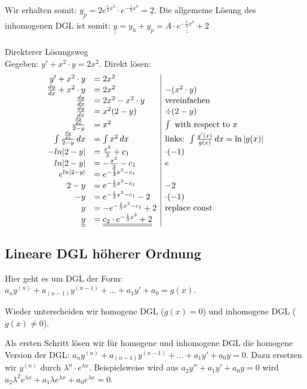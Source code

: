 Wir erhalten somit: $\underline{y_p} = 2 e^{\frac{1}{3}x^3} \cdot e^{-\frac{1}{3}x^3} = \underline{2}$.
Die allgemeine Lösung des inhomogenen DGL ist somit:
$\underline{\underline{y}} = y_h + y_p = \underline{\underline{A \cdot e^{-\frac{1}{3}x^3} + 2}}$
\\
\\
Direkterer Lösungsweg\\
Gegeben: $y' + x^2 \cdot y = 2x^2$.
Direkt lösen:
\begin{equation*}
\begin{array}{r l |l}
y' + x^2 \cdot y &= 2x^2\\
\frac{dy}{dx} + x^2 \cdot y &= 2x^2 \quad & -(x^2 \cdot y)\\
\frac{dy}{dx} &= 2x^2 -x^2 \cdot y \quad & \text{vereinfachen}\\
\frac{dy}{dx} &= x^2 ( 2 - y) \quad & \div (2 - y) \\
\frac{\frac{dy}{dx}}{2 - y} &= x^2  & \int \text{ with respect to } x \\
\int \frac{\frac{dy}{dx}}{2 - y}  \, dx &= \int x^2 \, dx & \text{links: } \int \frac{g'(x)}{g(x)} \, dx = \ln|g(x)|\\ 
- ln |2 - y| &= \frac{x^3}{3} + c_1 & \cdot (-1) \\
ln |2 - y| &= - \frac{x^3}{3} - c_1 & e \\
e^{ln |2 - y|} &= e^{-\frac{1}{3}x^3 - c_1 } \\
2 - y &= e^{-\frac{1}{3}x^3 - c_1 }& - 2 \\
- y &= e^{-\frac{1}{3}x^3 - c_1 } - 2 & \cdot (-1)\\
y &= - e^{-\frac{1}{3}x^3 - c_1 } + 2 & \text{replace const} \\
\underline{\underline{y}} &= \underline{\underline{c_2 \cdot e^{-\frac{1}{3}x^3} + 2}}\\
\end{array} 
\end{equation*}


\subsection{Lineare DGL höherer Ordnung}
Hier geht es um DGL der Form:
$a_n y^{(n)}+a_{(n-1)}y^{(n-1)}+\ldots+a_1 y'+a_0=g(x)$.

Wieder unterscheiden wir homogene DGL ($g(x) = 0$) und inhomogene DGL ($g(x) \neq 0$).

Als ersten Schritt lösen wir für homogene und inhomogene DGL die homogene Version der DGL:
$a_n y^{(n)}+a_{(n-1)}y^{(n-1)}+\ldots+a_1 y'+a_0 y = 0$. Dazu ersetzen wir $y^{(n)}$ durch
$\lambda^n \cdot e^{\lambda x}$. Beispielsweise wird aus $a_2 y'' + a_1 y' + a_0 y = 0$ wird
$a_2 \lambda^2 e^{\lambda x} + a_1 \lambda e^{\lambda x} + a_0 e^{\lambda x} = 0$.

